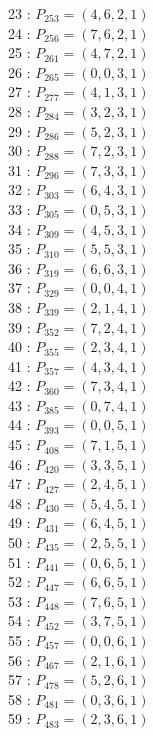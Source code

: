 \documentclass{article}
\begin{document}
{\begin{multicols}{3}
23 : $P_{253}=( 4, 6, 2, 1 )$\\
24 : $P_{256}=( 7, 6, 2, 1 )$\\
25 : $P_{261}=( 4, 7, 2, 1 )$\\
26 : $P_{265}=( 0, 0, 3, 1 )$\\
27 : $P_{277}=( 4, 1, 3, 1 )$\\
28 : $P_{284}=( 3, 2, 3, 1 )$\\
29 : $P_{286}=( 5, 2, 3, 1 )$\\
30 : $P_{288}=( 7, 2, 3, 1 )$\\
31 : $P_{296}=( 7, 3, 3, 1 )$\\
32 : $P_{303}=( 6, 4, 3, 1 )$\\
33 : $P_{305}=( 0, 5, 3, 1 )$\\
34 : $P_{309}=( 4, 5, 3, 1 )$\\
35 : $P_{310}=( 5, 5, 3, 1 )$\\
36 : $P_{319}=( 6, 6, 3, 1 )$\\
37 : $P_{329}=( 0, 0, 4, 1 )$\\
38 : $P_{339}=( 2, 1, 4, 1 )$\\
39 : $P_{352}=( 7, 2, 4, 1 )$\\
40 : $P_{355}=( 2, 3, 4, 1 )$\\
41 : $P_{357}=( 4, 3, 4, 1 )$\\
42 : $P_{360}=( 7, 3, 4, 1 )$\\
43 : $P_{385}=( 0, 7, 4, 1 )$\\
44 : $P_{393}=( 0, 0, 5, 1 )$\\
45 : $P_{408}=( 7, 1, 5, 1 )$\\
46 : $P_{420}=( 3, 3, 5, 1 )$\\
47 : $P_{427}=( 2, 4, 5, 1 )$\\
48 : $P_{430}=( 5, 4, 5, 1 )$\\
49 : $P_{431}=( 6, 4, 5, 1 )$\\
50 : $P_{435}=( 2, 5, 5, 1 )$\\
51 : $P_{441}=( 0, 6, 5, 1 )$\\
52 : $P_{447}=( 6, 6, 5, 1 )$\\
53 : $P_{448}=( 7, 6, 5, 1 )$\\
54 : $P_{452}=( 3, 7, 5, 1 )$\\
55 : $P_{457}=( 0, 0, 6, 1 )$\\
56 : $P_{467}=( 2, 1, 6, 1 )$\\
57 : $P_{478}=( 5, 2, 6, 1 )$\\
58 : $P_{481}=( 0, 3, 6, 1 )$\\
59 : $P_{483}=( 2, 3, 6, 1 )$\\

\end{multicols}}
\end{document}
